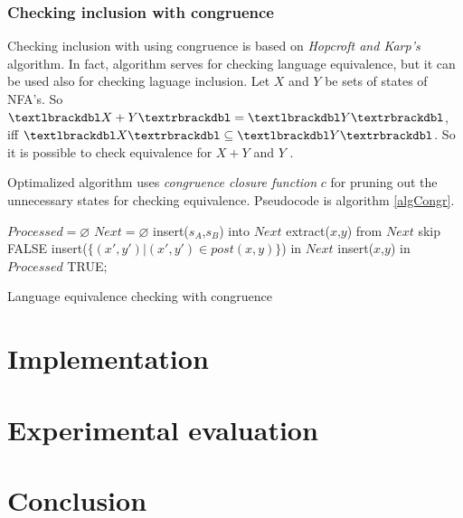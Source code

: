 \subsection{Checking inclusion with congruence}
Checking inclusion with using congruence is based on \emph{Hopcroft and Karp's} algorithm. In fact, algorithm serves for checking language equivalence, but it can
be used also for checking laguage inclusion. Let $X$ and $Y$ be sets of states of NFA's. 
So $\textlbrackdbl X+Y\textrbrackdbl = \textlbrackdbl Y \textrbrackdbl$,
iff $\textlbrackdbl X\textrbrackdbl \subseteq \textlbrackdbl Y \textrbrackdbl$. So it is possible to check equivalence for $X+Y$ and $Y$ \cite{congr}.

Optimalized algorithm uses \emph{congruence closure function} $c$ \cite{congr} for pruning out the unnecessary states for checking equivalence.
Pseudocode is algorithm \ref{algCongr}.\\
\newline
\begin{algorithm}[h]
	\label{algCongr}
		$Processed = \varnothing$\;
		$Next = \varnothing$\;
		insert($s_A$,$s_B$) into $Next$\;
		{
			extract($x$,$y$) from $Next$\;
			{skip\;}
			{
				\Return FALSE\;
			}
			insert($\{(x',y')| (x',y') \in post(x,y)\}$) in $Next$\;
			insert($x$,$y$) in $Processed$\;
		}
		\Return TRUE;
		\caption{Language equivalence checking with congruence}
\end{algorithm}
\chapter{Implementation}
\label{implementation}
\chapter{Experimental evaluation}
\label{eval}
\chapter{Conclusion}
\label{concl}
